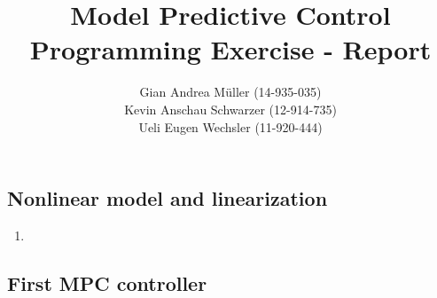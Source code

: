 \documentclass[11pt]{article}
\begin{document}
 
 
 
\title{Model Predictive Control\\
    Programming Exercise - Report} %
\author{Gian Andrea M{\"u}ller (14-935-035)\\
    Kevin Anschau Schwarzer (12-914-735)\\
    Ueli Eugen Wechsler (11-920-444)} %

\maketitle

\subsection*{Nonlinear model and linearization} %
\label{sub:nonlinear_model_and_linearization}

\begin{enumerate}
    \item
\end{enumerate}


\subsection*{First MPC controller} %
\label{sub:first_mpc_controller}
\end{document}

